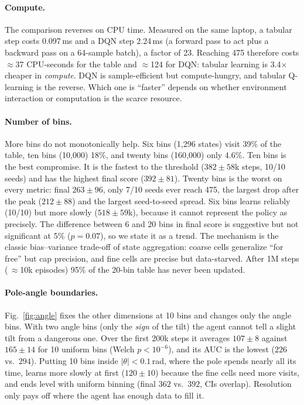 \paragraph{Compute.} The comparison reverses on CPU time. Measured on the same laptop, a tabular step costs
0.097\,ms and a DQN step 2.24\,ms (a forward pass to act plus a backward pass on a 64-sample batch), a factor
of 23. Reaching 475 therefore costs $\approx$37 CPU-seconds for the table and $\approx$124 for DQN:
tabular learning is 3.4$\times$ cheaper in \emph{compute}. DQN is sample-efficient but compute-hungry,
and tabular Q-learning is the reverse. Which one is ``faster'' depends on whether environment interaction
or computation is the scarce resource.

\paragraph{Number of bins.} More bins do not monotonically help. Six bins (1{,}296 states) visit 39\% of the
table, ten bins (10{,}000) 18\%, and twenty bins (160{,}000) only 4.6\%. Ten bins is the best compromise.
It is the fastest to the threshold ($382\pm58$k steps, 10/10 seeds) and has the highest final score
($392\pm81$). Twenty bins is the worst on every metric: final $263\pm96$, only 7/10 seeds ever reach 475,
the largest drop after the peak ($212\pm88$) and the largest seed-to-seed spread. Six bins learns
reliably (10/10) but more slowly ($518\pm59$k), because it cannot represent the policy as precisely. The
difference between 6 and 20 bins in final score is suggestive but not significant at 5\% ($p=0.07$), so
we state it as a trend. The mechanism is the classic bias--variance trade-off of state aggregation:
coarse cells generalize ``for free'' but cap precision, and fine cells are precise but data-starved.
After 1M steps (\,$\approx$10k episodes) 95\% of the 20-bin table has never been updated.

\paragraph{Pole-angle boundaries.} Fig.~\ref{fig:angle} fixes the other dimensions at 10 bins and changes
only the angle bins. With two angle bins (only the \emph{sign} of the tilt) the agent cannot tell a slight
tilt from a dangerous one. Over the first 200k steps it averages $107\pm8$ against $165\pm14$ for 10 uniform
bins (Welch $p<10^{-6}$), and its AUC is the lowest ($226$ vs.\ $294$). Putting 10 bins inside
$|\theta|<0.1$\,rad, where the pole spends nearly all its time, learns more slowly at first ($120\pm10$)
because the fine cells need more visits, and ends level with uniform binning (final $362$ vs.\ $392$,
CIs overlap). Resolution only pays off where the agent has enough data to fill it.

